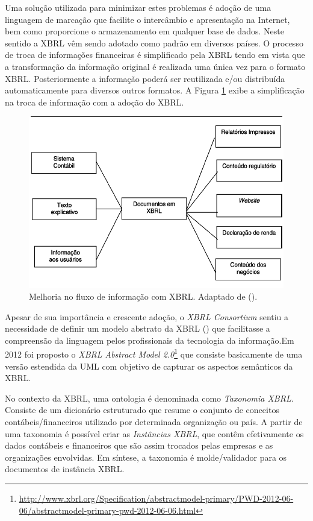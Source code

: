 \documentclass[msc,proposal,hidelot,hideabstract]{ppgccufmg} %
\begin{document}
Uma solução utilizada para minimizar estes problemas é adoção de uma linguagem de marcação que facilite o intercâmbio e apresentação na Internet, bem como proporcione o armazenamento em qualquer base de dados. Neste sentido a XBRL vêm sendo adotado como padrão em diversos países. O processo de troca de informações financeiras é simplificado pela XBRL tendo em vista que a transformação da informação original é realizada uma única vez para o formato XBRL. Posteriormente a informação poderá ser reutilizada e/ou distribuída automaticamente para diversos outros formatos. A Figura \ref{fig:fluxo_info_xbrl} exibe a simplificação na troca de informação com a adoção do XBRL.

\begin{figure}[hbtp]
\centering
\includegraphics[width=.75\textwidth]{img/fluxo_info_xbrl.png}
\caption{Melhoria no fluxo de informação com XBRL. Adaptado de (\cite{hoffman2001xbrl}).}
\label{fig:fluxo_info_xbrl}
\end{figure}

Apesar de sua importância e crescente adoção, o \textit{XBRL Consortium} sentiu a necessidade de definir um modelo abstrato da XBRL (\cite{xbrl_preserve_promote_particite}) que facilitasse a compreensão da linguagem pelos profissionais da tecnologia da informação.Em 2012 foi proposto o \textit{XBRL Abstract Model 2.0}\footnote{\url{http://www.xbrl.org/Specification/abstractmodel-primary/PWD-2012-06-06/abstractmodel-primary-pwd-2012-06-06.html}} que consiste basicamente de uma versão estendida da UML com objetivo de capturar os aspectos semânticos da XBRL.

No contexto da XBRL, uma ontologia é denominada como \textit{Taxonomia XBRL}{}. Consiste de um dicionário estruturado que resume o conjunto de conceitos contábeis/financeiros utilizado por determinada organização ou país. A partir de uma taxonomia é possível criar as \textit{Instâncias XBRL}, que contêm efetivamente os dados contábeis e financeiros que são assim trocados pelas empresas e as organizações envolvidas. Em síntese, a taxonomia é molde/validador para os documentos de instância XBRL.
\end{document}
